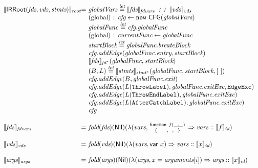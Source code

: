 \[
\begin{array}{l@{}l@{~}l}
\transfun{\IRRoot(\emph{fds}, \emph{vds}, \emph{stmts})}_{\emph{root}}
& = & \emph{globalVars} \letval \transfun{\emph{fds}}_{\emph{fdvars}} ~\emph{++}~ \transfun{\emph{vds}}_{\emph{vds}} \\
& & \text{(global) : } \emph{cfg} \leftarrow \new\ \CFG(\emph{globalVars})\\
& & \emph{globalFunc} \letval \emph{cfg}.\emph{globalFunc}\\
& & \text{(global) : } \emph{currentFunc} \leftarrow \emph{globalFunc}\\
& & \emph{startBlock} \letval \emph{globalFunc}.\emph{breateBlock}\\
& & \emph{cfg}.\emph{addEdge}(\emph{globalFunc}.\emph{entry}, \emph{startBlock})\\
& & \transfun{\emph{fds}}_{\emph{fd}^*}(\emph{globalFunc}, \emph{startBlock})\\
& & (B, L) \letval \transfun{\emph{stmts}}_{\emph{stmt}^{*}}(\emph{globalFunc}, \emph{startBlock}, [\ ])\\
& & \emph{cfg}.\emph{addEdge}(B, \emph{globalFunc}.\emph{exit})\\
& & \emph{cfg}.\emph{addEdge}(L(\TT{ThrowLabel}), \emph{globalFunc}.\emph{exitExc}, \EdgeExc)\\
& & \emph{cfg}.\emph{addEdge}(L(\TT{ThrowEndLabel}), \emph{globalFunc}.\emph{exitExc})\\
& & \emph{cfg}.\emph{addEdge}(L(\TT{AfterCatchLabel}), \emph{globalFunc}.\emph{exitExc})\\
& & \emph{cfg}\\
& & \\

\transfun{\emph{fds}}_{\emph{fdvars}} & = &
\fold(\emph{fds})(\Nil)(\lambda(\emph{vars}, \irfundeclsmall{f}{\_}{\_}{\_}{\_}{\_}{\_} \Rightarrow \emph{vars} :: \transfun{f}_{\emph{id}})\\
& & \\

\transfun{\emph{vds}}_{\emph{vds}} & = &
\fold(\emph{vds})(\Nil)(\lambda(\emph{vars}, \irvar{x})\Rightarrow \emph{vars} :: \transfun{x}_{\emph{id}})\\
& & \\

\transfun{\emph{args}}_{\emph{args}} & = &
\fold(\emph{args})(\Nil)(\lambda(\emph{args}, x = \emph{arguments}[i]) \Rightarrow \emph{args} :: \transfun{x}_{\emph{id}})\\
& & \\


\end{array}\]
